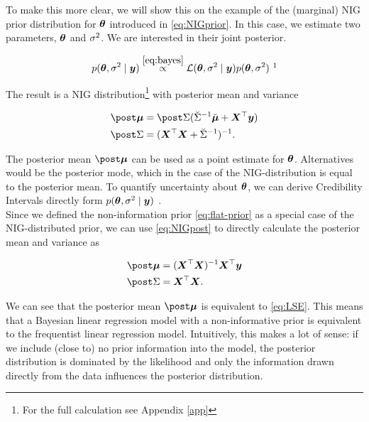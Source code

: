 To make this more clear, we will show this on the example of the (marginal) NIG prior distribution for $\bm{\theta}$ introduced in \eqref{eq:NIGprior}. In this case, we estimate two parameters, $\bm{\theta}$ and $\sigma^2$. We are interested in their joint posterior.

\begin{equation*}
    p(\btheta, \ssd \mid \by) \overset{\eqref{eq:bayes}}{\propto} \Lcal(\btheta, \ssd \mid \by) p(\btheta, \ssd) \ \footnotemark
\end{equation*}


The result is a NIG distribution\footnote{For the full calculation see Appendix \ref{app}} with posterior mean and variance


\begin{equation} \label{NIGpost}
    \begin{aligned}
        \mupo &= \Sdpo (\Sdipri \mupri + \bX^\top \by) \\
        \Sdpo &= (\bX^\top \bX + \Sdipri)^{-1}.
    \end{aligned}
\end{equation}

The posterior mean $\mupo$ can be used as a point estimate for $\bm{\theta}$. Alternatives would be the posterior mode, which in the case of the NIG-distribution is equal to the posterior mean. To quantify uncertainty about $\bm{\theta}$, we can derive Credibility Intervals directly form $p(\bm{\theta}, \sigma^2 \mid \bm{y})$ \citep{held_likelihood_2020}.\\

Since we defined the non-information prior \eqref{eq:flat-prior} as a special case of the NIG-distributed prior, we can use \eqref{eq:NIGpost} to directly calculate the posterior mean and variance as

\begin{equation*}
    \begin{aligned}
        \mupo &= (\bX^\top \bX)^{-1} \bX^\top \by \\
        \Sdpo &= \bX^\top \bX.
    \end{aligned}
\end{equation*}

We can see that the posterior mean $\mupo$ is equivalent to \eqref{eq:LSE}.
This means that a Bayesian linear regression model with a non-informative prior is equivalent to the frequentist linear regression model.
Intuitively, this makes a lot of sense: if we include (close to) no prior information into the model, the posterior distribution is dominated by the likelihood and only the information drawn directly from the data influences the posterior distribution.\\

